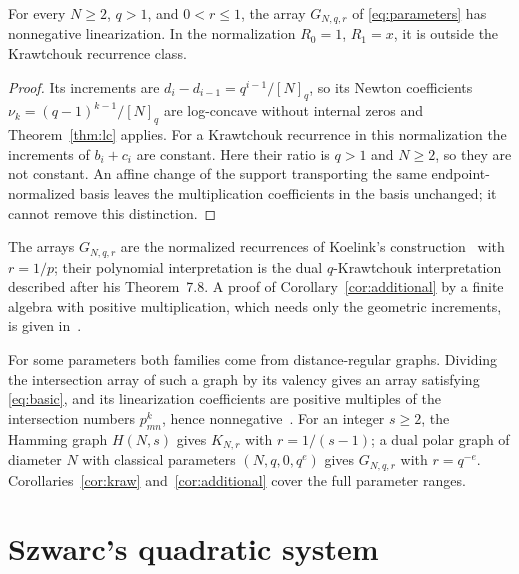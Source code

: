 \begin{corollary}\label{cor:additional}
For every $N\geq2$, $q>1$, and $0<r\leq1$, the array $G_{N,q,r}$ of \eqref{eq:parameters} has nonnegative linearization. In the normalization $R_0=1$, $R_1=x$, it is outside the Krawtchouk recurrence class.
\end{corollary}
\begin{proof}
Its increments are $d_i-d_{i-1}=q^{i-1}/[N]_q$, so its Newton coefficients $\nu_k=(q-1)^{k-1}/[N]_q$ are log-concave without internal zeros and Theorem~\ref{thm:lc} applies. For a Krawtchouk recurrence in this normalization the increments of $b_i+c_i$ are constant. Here their ratio is $q>1$ and $N\geq2$, so they are not constant. An affine change of the support transporting the same endpoint-normalized basis leaves the multiplication coefficients in the basis unchanged; it cannot remove this distinction.
\end{proof}

The arrays $G_{N,q,r}$ are the normalized recurrences of Koelink's construction~\cite[Theorems~3.1(ii) and~7.1]{koelink} with $r=1/p$; their polynomial interpretation is the dual $q$-Krawtchouk interpretation described after his Theorem~7.8. A proof of Corollary~\ref{cor:additional} by a finite algebra with positive multiplication, which needs only the geometric increments, is given in~\cite{P3}.

For some parameters both families come from distance-regular graphs. Dividing the intersection array of such a graph by its valency gives an array satisfying \eqref{eq:basic}, and its linearization coefficients are positive multiples of the intersection numbers $p^k_{mn}$, hence nonnegative~\cite{bcn,vdkt}. For an integer $s\geq2$, the Hamming graph $H(N,s)$ gives $K_{N,r}$ with $r=1/(s-1)$; a dual polar graph of diameter $N$ with classical parameters $(N,q,0,q^e)$ gives $G_{N,q,r}$ with $r=q^{-e}$. Corollaries~\ref{cor:kraw} and~\ref{cor:additional} cover the full parameter ranges.

\section{Szwarc's quadratic system}\label{sec:szwarc}


